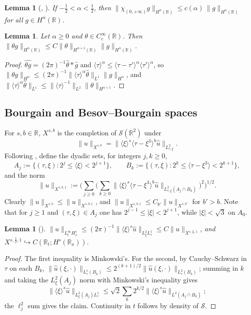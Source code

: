 \documentclass[10pt,reqno]{amsart}
\newtheorem{lemma}[theorem]{Lemma}
\theoremstyle{remark}
\numberwithin{equation}{section}
\newcommand{\R}{\mathbb R}
\newcommand{\lan}{\langle}
\newcommand{\ran}{\rangle}
\begin{document}
\begin{lemma}[{\cite[Lemma 3.5]{JK}}, {\cite[Lemma 4.2]{Holmer}}]\label{lem:JK}
If $-\frac12<\alpha<\frac12$, then $\|\chi_{(0,+\infty)}g\|_{H^\alpha(\R)}\le c(\alpha)\,\|g\|_{H^\alpha(\R)}$ for all $g\in H^\alpha(\R)$.
\end{lemma}

\begin{lemma}\label{lem:cutoff}
Let $\alpha\ge0$ and $\theta\in C_c^\infty(\R)$. Then $\|\theta g\|_{H^\alpha(\R)}\le C\|\theta\|_{H^{\alpha+1}(\R)}\|g\|_{H^\alpha(\R)}$.
\end{lemma}
\begin{proof}
$\widehat{\theta g}=(2\pi)^{-1}\widehat\theta*\widehat g$ and $\lan\tau\ran^\alpha\le\lan\tau-\tau'\ran^\alpha\lan\tau'\ran^\alpha$, so $\|\theta g\|_{H^\alpha}\le(2\pi)^{-1}\|\lan\tau\ran^\alpha\widehat\theta\|_{L^1}\|g\|_{H^\alpha}$, and $\|\lan\tau\ran^\alpha\widehat\theta\|_{L^1}\le\|\lan\tau\ran^{-1}\|_{L^2}\|\theta\|_{H^{\alpha+1}}$.
\end{proof}

\subsection{Bourgain and Besov--Bourgain spaces}
For $s,b\in\R$, $X^{s,b}$ is the completion of $\mathcal S(\R^2)$ under
$$\|u\|_{X^{s,b}}=\|\lan\xi\ran^s\lan\tau-\xi^3\ran^b\widehat u\|_{L^2_{\tau,\xi}}.$$
Following \cite{Kishimoto}, define the dyadic sets, for integers $j,k\ge0$,
\begin{equation}\label{besov}
A_j := \{ (\tau, \xi) : 2^j \leq \langle \xi \rangle < 2^{j+1} \}, \qquad
B_k := \{ (\tau, \xi) : 2^k \leq \langle \tau - \xi^3 \rangle < 2^{k+1} \},
\end{equation}
and the norm
\begin{equation}\label{eq:Xsb1}
\|u\|_{X^{s,b,1}} := \Big( \sum_{j\ge0} \Big( \sum_{k\ge0} \|\langle \xi \rangle^s \langle \tau - \xi^3 \rangle^b \hat{u} \|_{L^2_{\tau,\xi}(A_j\cap B_k)} \Big)^2 \Big)^{1/2}.
\end{equation}
Clearly $\|u\|_{X^{s,b}}\le\|u\|_{X^{s,b,1}}$, and $\|u\|_{X^{s,b,1}}\le C_{b'}\|u\|_{X^{s,b'}}$ for $b'>b$. Note that for $j\ge1$ and $(\tau,\xi)\in A_j$ one has $2^{j-1}\le|\xi|<2^{j+1}$, while $|\xi|<\sqrt3$ on $A_0$.

\begin{lemma}[{\cite[Section 2]{Kishimoto}}]\label{lem:embedding}
$\|u\|_{L^\infty_tH^s_x}\le(2\pi)^{-1}\|\lan\xi\ran^s\widehat u\|_{L^2_\xi L^1_\tau}\le C\|u\|_{X^{s,\frac12,1}}$, and $X^{s,\frac12,1}\hookrightarrow C(\R_t;H^s(\R_x))$.
\end{lemma}
\begin{proof}
The first inequality is Minkowski's. For the second, by Cauchy--Schwarz in $\tau$ on each $B_k$, $\|\widehat u(\xi,\cdot)\|_{L^1_\tau(B_k)}\le 2^{(k+1)/2}\|\widehat u(\xi,\cdot)\|_{L^2_\tau(B_k)}$; summing in $k$ and taking the $L^2_\xi(A_j)$ norm with Minkowski's inequality gives $$\|\lan\xi\ran^s\widehat u\|_{L^2_\xi(A_j)L^1_\tau}\le\sqrt2\sum_k 2^{k/2}\|\lan\xi\ran^s\widehat u\|_{L^2(A_j\cap B_k)};$$ the $\ell^2_j$ sum gives the claim. Continuity in $t$ follows by density of $\mathcal S$.
\end{proof}
\end{document}
